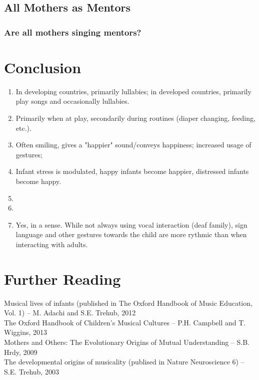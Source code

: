 \documentclass{beamer}
\begin{document}
\subsection*{All Mothers as Mentors}
\begin{frame}
	\frametitle{Are all mothers singing mentors?}
\end{frame}

\section{Conclusion}
\begin{frame}
	\begin{enumerate}
		\item In developing countries, primarily lullabies; in developed countries, primarily play songs and occasionally lullabies.
		\item Primarily when at play, secondarily during routines (diaper changing, feeding, etc.).
		\item Often smiling, gives a "happier" sound/conveys happiness; increased usage of gestures; %
		\item Infant stress is modulated, happy infants become happier, distressed infants become happy.
		\item %
		\item %
		\item Yes, in a sense. While not always using vocal interaction (deaf family), sign language and other gestures towards the child are more rythmic than when interacting with adults.
	\end{enumerate}
\end{frame}

\section{Further Reading}
\begin{frame}
	Musical lives of infants (published in The Oxford Handbook of Music Education, Vol. 1) -- M. Adachi and S.E. Trehub, 2012\\
	The Oxford Handbook of Children's Musical Cultures -- P.H. Campbell and T. Wiggins, 2013\\
	Mothers and Others: The Evolutionary Origins of Mutual Understanding -- S.B. Hrdy, 2009\\
	The developmental origins of musicality (publised in Nature Neuroscience 6) -- S.E. Trehub, 2003
	
\end{frame}
\end{document}

